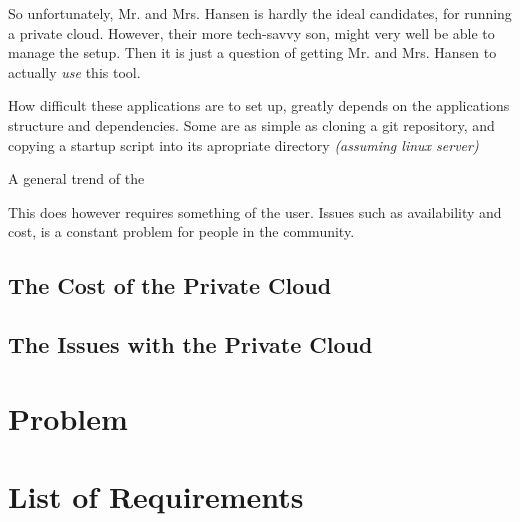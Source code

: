 			So unfortunately, Mr. and Mrs. Hansen is hardly the ideal candidates, for running a private cloud. However, their more tech-savvy son, might very well be able to manage the setup. Then it is just a question of getting Mr. and Mrs. Hansen to actually \emph{use} this tool.








			How difficult these applications are to set up, greatly depends on the applications structure and dependencies. Some are as simple as cloning a git repository, and copying a startup script into its apropriate directory \emph{(assuming linux server)}


			A general trend of the 





		













		This does however requires something of the user. Issues such as availability and cost, is a constant problem for people in the community. 












	\subsection*{The Cost of the Private Cloud}


	\subsection*{The Issues with the Private Cloud}










































	\section{Problem}
	\section{List of Requirements}